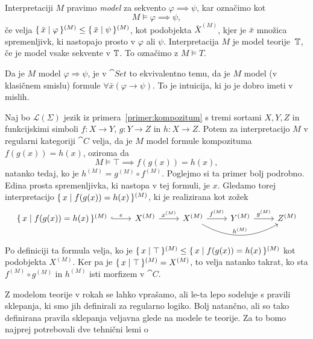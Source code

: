 \documentclass[../kategoricna_logika.tex]{subfiles}
\begin{document}
\begin{definicija}
  Interpretaciji $M$ pravimo \emph{model} za sekvento
  $\varphi \implies \psi$, kar označimo kot
  $$M \models \varphi \implies \psi,$$
  če velja
  $\lbrace\,\bar{x} \mid \varphi\,\rbrace^{(M)} \leq \lbrace\,\bar{x} \mid
    \psi\,\rbrace^{(M)}$, kot podobjekta $\bar{X}^{(M)}$, kjer je $\bar{x}$
  množica spremenljivk, ki nastopajo prosto v $\varphi$ ali $\psi$.
  Interpretacija $M$ je model teorije~$\mathbb{T}$, če je model vsake sekvente
  v $\mathbb{T}$.  To označimo z $M \models T$.
\end{definicija}
\begin{opomba}
  Da je $M$ model $\varphi \Rightarrow \psi$, je v $\cat{Set}$ to
  ekvivalentno temu, da je $M$ model (v klasičnem smislu) formule
  $\forall \bar{x} (\varphi \rightarrow \psi)$. To je intuicija, ki jo
  je dobro imeti v mislih.
\end{opomba}
\begin{primer}
  Naj bo $\mathcal{L}(\Sigma)$ jezik iz primera~\ref{primer:kompozitum}
  s tremi sortami $X,Y,Z$ in funkcijskimi simboli
  $f : X \to Y$, $g : Y \to Z$ in $h : X \to Z$.  Potem za
  interpretacijo $M$ v regularni kategoriji $\cat{C}$ velja, da je $M$
  model formule kompozituma $f(g(x)) = h(x)$, oziroma da
  $$M \models \top \implies f(g(x)) = h(x),$$ 
  natanko tedaj, ko je $h^{(M)} = g^{(M)} \circ f^{(M)}$.  Poglejmo si
  ta primer bolj podrobno.  Edina prosta spremenljivka, ki nastopa v
  tej formuli, je $x$. Gledamo torej interpretacijo
  $\lbrace\,x  \mid  f(g(x)) = h(x)\,\rbrace^{(M)}$, ki je realizirana kot
  zožek
  \begin{equation*}
    \begin{tikzcd}[column sep=normal]
      \set{x  \mid  f(g(x)) = h(x)}^{(M)} \ar[r, hook, "e"] &
      X^{(M)} \ar[r, "x^{(M)}"] & X^{(M)} \ar[r, "f^{(M)}"] \ar[rr,
      bend right, "h^{(M)}"] & Y^{(M)} \ar[r, "g^{(M)}"] & Z^{(M)}
    \end{tikzcd}
  \end{equation*}
  Po definiciji ta formula velja, ko je
  $\lbrace\,x  \mid  \top\,\rbrace^{(M)} \leq \lbrace\,x  \mid  f(g(x)) =
    h(x)\,\rbrace^{(M)}$ kot podobjekta $X^{(M)}$.  Ker pa je
  $\lbrace\,x  \mid  \top\,\rbrace^{(M)} = X^{(M)}$, to velja natanko
  takrat, ko sta $f^{(M)} \circ g^{(M)}$ in $h^{(M)}$ isti morfizem v
  $\cat{C}$.
\end{primer}
Z modelom teorije v rokah se lahko vprašamo, ali le-ta lepo sodeluje s
pravili sklepanja, ki smo jih definirali za regularno logiko.  Bolj
natančno, ali so tako definirana pravila sklepanja veljavna glede na
modele te teorije.  Za to bomo najprej potrebovali dve tehnični lemi o
\end{document}
